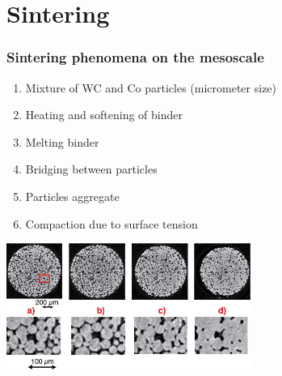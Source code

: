 \documentclass[11pt,mathserif]{beamer}
\begin{document}
\section{Sintering}
\begin{frame}
 \frametitle{Sintering phenomena on the mesoscale}


 \begin{enumerate}
  \item Mixture of WC and Co particles (micrometer size)
  \item Heating and softening of binder
  \item Melting binder
  \item Bridging between particles
  \item Particles aggregate
  \item Compaction due to surface tension
 \end{enumerate}
\begin{center}
 \includegraphics[width=0.6\textwidth]{figures/fig081.jpeg}
\end{center}
\end{frame}
\end{document}
